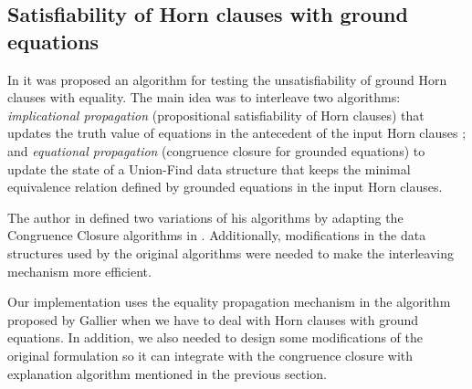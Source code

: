\subsection{Satisfiability of Horn clauses with ground equations}

In \cite{GALLIER1987233} it was proposed an algorithm 
for testing the unsatisfiability
of ground Horn clauses with equality. The main idea was 
to interleave two algorithms: \emph{implicational propagation}
(propositional satisfiability of Horn clauses) that 
updates the truth value of equations in the antecedent 
of the input Horn clauses \cite{DOWLING1984267}; and 
\emph{equational propagation} (congruence closure for 
grounded equations) to update the state of a 
Union-Find data structure \cite{10.1145/364099.364331}
that keeps the minimal equivalence relation defined 
by grounded equations in the input Horn clauses.

The author in \cite{GALLIER1987233} defined two 
variations of his algorithms by adapting
the Congruence Closure algorithms in 
\cite{10.1145/322217.322228, 10.1145/322186.322198}.
Additionally, modifications in the data structures 
used by the original algorithms were needed
to make the interleaving mechanism more efficient.

Our implementation uses the equality propagation
mechanism in the algorithm proposed by Gallier
when we have to deal with Horn clauses with ground
equations. In addition, we also needed to design
some modifications of the original formulation so
it can integrate with the congruence closure with
explanation algorithm mentioned in the previous 
section.

